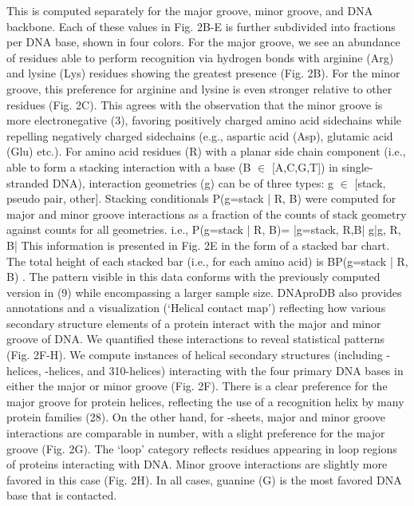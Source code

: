 This is computed separately for the major groove, minor groove, and DNA backbone. Each of these values in Fig. 2B-E is further subdivided into fractions per DNA base, shown in four colors. For the major groove, we see an abundance of residues able to perform recognition via hydrogen bonds with arginine (Arg) and lysine (Lys) residues showing the greatest presence (Fig. 2B). For the minor groove, this preference for arginine and lysine is even stronger relative to other residues (Fig. 2C). This agrees with the observation that the minor groove is more electronegative (3), favoring positively charged amino acid sidechains while repelling negatively charged sidechains (e.g., aspartic acid (Asp), glutamic acid (Glu) etc.). 
For amino acid residues (R) with a planar side chain component (i.e., able to form a stacking interaction with a base (B $\in$ [A,C,G,T]) in single-stranded DNA), interaction geometries (g) can be of three types: g $\in$ [stack, pseudo pair, other]. Stacking conditionals P(g=stack | R, B) were computed for major and minor groove interactions as a fraction of the counts of stack geometry against counts for all geometries. i.e.,
P(g=stack | R, B)= |g=stack, R,B|  g|g, R, B| 
This information is presented in Fig. 2E in the form of a stacked bar chart. The total height of each stacked bar (i.e., for each amino acid) is BP(g=stack | R, B) . The pattern visible in this data conforms with the previously computed version in (9) while encompassing a larger sample size.
DNAproDB also provides annotations and a visualization (‘Helical contact map’) reflecting how various secondary structure elements of a protein interact with the major and minor groove of DNA. We quantified these interactions to reveal statistical patterns (Fig. 2F-H). We compute instances of helical secondary structures (including -helices, -helices, and 310-helices) interacting with the four primary DNA bases in either the major or minor groove (Fig. 2F). There is a clear preference for the major groove for protein helices, reflecting the use of a recognition helix by many protein families (28). On the other hand, for -sheets, major and minor groove interactions are comparable in number, with a slight preference for the major groove (Fig. 2G). The ‘loop’ category reflects residues appearing in loop regions of proteins interacting with DNA. Minor groove interactions are slightly more favored in this case (Fig. 2H). In all cases, guanine (G) is the most favored DNA base that is contacted. 

